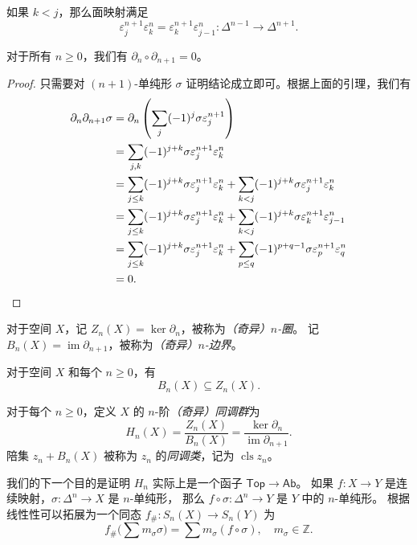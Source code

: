 \documentclass[fontset=none]{Notes}
\DeclareMathOperator\im{im}
\DeclareMathOperator\cls{cls}
\newcommand{\cat}[1]{\mathsf{#1}}
\begin{document}
\begin{lemma}
  如果 $k<j$，那么面映射满足
  \[
    \varepsilon_j^{n+1}\varepsilon_k^n=\varepsilon_k^{n+1}\varepsilon_{j-1}^n
    :\Delta^{n-1}\to\Delta^{n+1}.
  \]
\end{lemma}

\begin{theorem}
  对于所有 $n\ge 0$，我们有 $\partial_n\circ \partial_{n+1}=0$。
\end{theorem}
\begin{proof}
  只需要对 $(n+1)$-单纯形 $\sigma$ 证明结论成立即可。根据上面的引理，我们有
  \begin{align*}
    \partial_n\partial_{n+1}\sigma&=
    \partial_n\left(\sum_j(-1)^j\sigma\varepsilon_j^{n+1}\right)\\
    &=\sum_{j,k}(-1)^{j+k}\sigma\varepsilon_j^{n+1}\varepsilon_k^n\\
    &=\sum_{j\leq k}(-1)^{j+k}\sigma\varepsilon_j^{n+1}\varepsilon_k^n
    +\sum_{k<j} (-1)^{j+k}\sigma\varepsilon_j^{n+1}\varepsilon_k^n\\
    &=\sum_{j\le k}(-1)^{j+k}\sigma\varepsilon_j^{n+1}\varepsilon_k^n
    +\sum_{k<j} (-1)^{j+k}\sigma\varepsilon_k^{n+1}\varepsilon_{j-1}^n\\
    &=\sum_{j\le k}(-1)^{j+k}\sigma\varepsilon_j^{n+1}\varepsilon_k^n
    +\sum_{p\leq q}(-1)^{p+q-1}\sigma\varepsilon_p^{n+1}\varepsilon_q^n\\
    &=0.\qedhere
  \end{align*}
\end{proof}

\begin{definition}
  对于空间 $X$，记 $Z_n(X)=\ker\partial_n$，被称为\emph{（奇异）$n$-圈}。
  记 $B_n(X)=\im\partial_{n+1}$，被称为\emph{（奇异）$n$-边界}。
\end{definition}

\begin{corollary}
  对于空间 $X$ 和每个 $n\geq 0$，有
  \[
    B_n(X)\subseteq Z_n(X).
  \]
\end{corollary}

\begin{definition}
  对于每个 $n\geq 0$，定义 $X$ 的 $n$-阶\emph{（奇异）同调群}为
  \[
    H_n(X)=\frac{Z_n(X)}{B_n(X)}=\frac{\ker\partial_n}{\im\partial_{n+1}}.
  \]
  陪集 $z_n+B_n(X)$ 被称为 $z_n$ 的\emph{同调类}，记为 $\cls z_n$。
\end{definition}

我们的下一个目的是证明 $H_n$ 实际上是一个函子 $\cat{Top}\to\cat{Ab}$。
如果 $f:X\to Y$ 是连续映射，$\sigma:\Delta^n\to X$ 是 $n$-单纯形，
那么 $f\circ \sigma:\Delta^n\to Y$ 是 $Y$ 中的 $n$-单纯形。
根据线性性可以拓展为一个同态 $f_\#:S_n(X)\to S_n(Y)$
为
\[
  f_\#\bigl(\sum m_\sigma\sigma\bigr)=\sum m_\sigma (f\circ\sigma),
  \quad m_\sigma\in \mathbb{Z}.
\]
\end{document}
